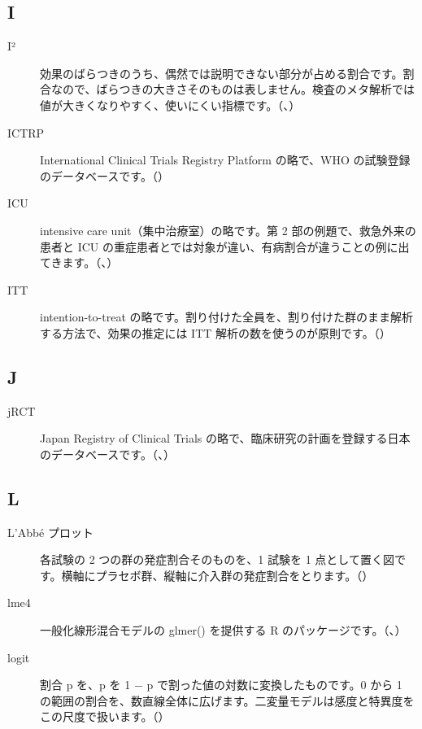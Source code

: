\subsection*{I}
\begin{description}
\item[I²] 効果のばらつきのうち、偶然では説明できない部分が占める割合です。割合なので、ばらつきの大きさそのものは表しません。検査のメタ解析では値が大きくなりやすく、使いにくい指標です。（、）
\item[ICTRP] International Clinical Trials Registry Platform の略で、WHO の試験登録のデータベースです。（）
\item[ICU] intensive care unit（集中治療室）の略です。第 2 部の例題で、救急外来の患者と ICU の重症患者とでは対象が違い、有病割合が違うことの例に出てきます。（、）
\item[ITT] intention-to-treat の略です。割り付けた全員を、割り付けた群のまま解析する方法で、効果の推定には ITT 解析の数を使うのが原則です。（）
\end{description}

\subsection*{J}
\begin{description}
\item[jRCT] Japan Registry of Clinical Trials の略で、臨床研究の計画を登録する日本のデータベースです。（、）
\end{description}

\subsection*{L}
\begin{description}
\item[L'Abbé プロット] 各試験の 2 つの群の発症割合そのものを、1 試験を 1 点として置く図です。横軸にプラセボ群、縦軸に介入群の発症割合をとります。（）
\item[lme4] 一般化線形混合モデルの glmer() を提供する R のパッケージです。（、）
\item[logit] 割合 p を、p を 1 − p で割った値の対数に変換したものです。0 から 1 の範囲の割合を、数直線全体に広げます。二変量モデルは感度と特異度をこの尺度で扱います。（）
\end{description}

